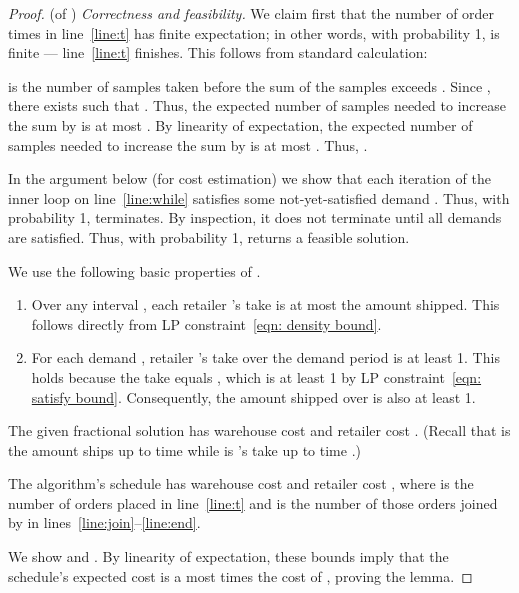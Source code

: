 \begin{proof}(of )
  {\em Correctness and feasibility.}
  We claim first that the number  of order times 
  in line~\ref{line:t} has finite expectation; in other words,
  	with probability 1,  is finite --- line~\ref{line:t} finishes.
This follows from standard calculation:
    
    is the number of samples taken before the sum of
    the samples exceeds .
    Since ,
    there exists  such that .
    Thus, the expected number of samples needed 
    to increase the sum by  is at most .
    By linearity of expectation,
    the expected number of samples needed to increase 
    the sum by  is at most
    .
    Thus, .

  In the argument below (for cost estimation)
	we show  that each iteration of the inner loop on line~\ref{line:while}
  satisfies some not-yet-satisfied demand .
  Thus, with probability 1,  terminates.
  By inspection, it does not terminate until all demands are satisfied.
  Thus, with probability 1,  
  returns a feasible solution.



We use the following basic properties of .
\begin{enumerate}
\item Over any interval ,
    each retailer 's take is at most the amount shipped.
    This follows directly from LP constraint~\eqref{eqn: density bound}.
\item For each demand ,
    retailer 's take over the demand period  is at least 1.
	This holds because the take equals , 
    which is at least 1 by LP constraint~\eqref{eqn:  satisfy bound}.
    Consequently, the amount shipped over  is also at least 1.
\end{enumerate}

  The given fractional solution  
  has warehouse cost 
  and retailer cost .
  (Recall that  is the amount  ships up to time  
  while  is 's take up to time .)

  The algorithm's schedule  has warehouse cost 
  and retailer cost ,
  where  is the number of orders placed in line~\ref{line:t}
  and  is the number of those orders joined by 
  in lines~\ref{line:join}--\ref{line:end}.

  We show 
  and .
  By linearity of expectation, these bounds imply that
  the schedule's expected cost is a most  times the cost of ,
  proving the lemma.

  \smallskip


\end{proof}
